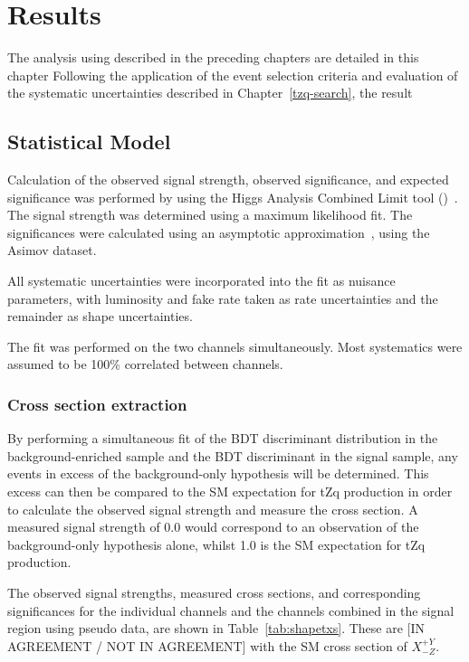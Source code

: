 \chapter{Results}\label{chapter:results}
The analysis using described in the preceding chapters are detailed in this chapter
Following the application of the event selection criteria and evaluation of the systematic uncertainties described in Chapter~\ref{tzq-search}, the result 

\section{Statistical Model}
Calculation of the observed signal strength, observed significance, and
expected significance was performed by using the Higgs Analysis Combined Limit
tool (\combine{})~\cite{Combine}. The signal strength was determined using a
maximum likelihood fit.  The significances were calculated using an asymptotic
approximation~\cite{AsymptoticFormulae}, using the Asimov dataset.

All systematic uncertainties were incorporated into the fit as nuisance
parameters, with luminosity and fake rate taken as rate uncertainties and the
remainder as shape uncertainties.
 
The fit was performed on the two channels simultaneously. Most systematics were
assumed to be 100\% correlated between channels.

\subsection{Cross section extraction}
 
By performing a simultaneous fit of the BDT discriminant distribution in the
background-enriched sample and the BDT discriminant in the signal sample, any
events in excess of the background-only hypothesis will be determined. This
excess can then be compared to the SM expectation for tZq production in order
to calculate the observed signal strength and measure the cross section. A
measured signal strength of 0.0 would correspond to an observation of the
background-only hypothesis alone, whilst 1.0 is the SM expectation for tZq
production.

 
The observed signal strengths, measured cross sections, and corresponding
significances for the individual channels and the channels combined in the
signal region using pseudo data, are shown in Table~\ref{tab:shapetxs}. These
are [IN AGREEMENT / NOT IN AGREEMENT] with the SM cross section of
$X^{+Y}_{-Z}$.
 
